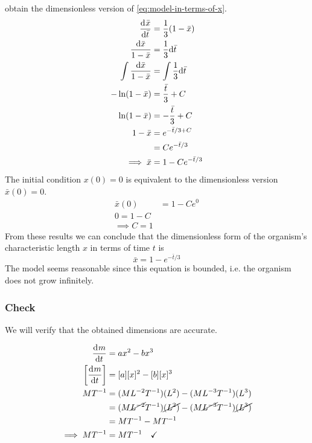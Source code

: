 \documentclass[12pt]{article}
\begin{document}
obtain the dimensionless version of \cref{eq:model-in-terms-of-x}.
\begin{equation}
  \label{eq:dimensionless-model-for-x-bar}
  \begin{aligned}
    \frac{\mathrm{d}^{} {\bar{x}}}{\mathrm{d}{\bar{t}}^{}} &= \frac{1}{3}(1-\bar{x}) \\
    \frac{\mathrm{d}{\bar{x}}}{1-\bar{x}} &= \frac{1}{3} \mathrm{d}{\bar{t}} \\
    \int \frac{\mathrm{d}{\bar{x}}}{1-\bar{x}} &= \int \frac{1}{3} \mathrm{d}{\bar{t}} \\
    -\ln (1-\bar{x}) &= \frac{\bar{t}}{3} + C \\
    \ln (1-\bar{x}) &= -\frac{\bar{t}}{3} + C \\
    1-\bar{x} &= e^{-\bar{t}/3+C} \\
    &= Ce^{-\bar{t}/3} \\
    \implies \bar{x} &= 1-Ce^{-\bar{t}/3}
  \end{aligned}
\end{equation}
The initial condition $x(0)=0$ is equivalent to the dimensionless version
$\bar{x}(0)=0$.
\begin{equation}
  \label{eq:dimensionless-model-for-x-bar-for-c}
  \begin{aligned}
    \bar{x}(0) &= 1-Ce^{0} \\
    0 = 1-C \\
    \implies C = 1
  \end{aligned}
\end{equation}
From these results we can conclude that the dimensionless form of the organism's
characteristic length $x$ in terms of time $t$ is
\begin{equation} \boxed{
    \bar{x} = 1-e^{-\bar{t}/3}
  }
\end{equation}
The model seems reasonable since this equation is bounded, i.e. the organism
does not grow infinitely.

\subsubsection*{Check}
We will verify that the obtained dimensions are accurate.

\begin{equation}
  \begin{aligned}
    \frac{\mathrm{d}^{} {m}}{\mathrm{d}{t}^{}} &= ax^2 - bx^3 \\
    \left[\frac{\mathrm{d}^{} {m}}{\mathrm{d}{t}^{}}\right] &= [a][x]^2 - [b][x]^3 \\
    MT^{-1} &= (ML^{-2}T^{-1})(L^2) - (ML^{-3}T^{-1})(L^3) \\
    &= (M\cancel{L^{-2}}T^{-1})\cancel{(L^2)} - (M\cancel{L^{-3}}T^{-1})\cancel{(L^3)} \\
    &= MT^{-1} - MT^{-1} \\
    \implies MT^{-1} &= MT^{-1} \quad\checkmark
  \end{aligned}
\end{equation}
\end{document}
